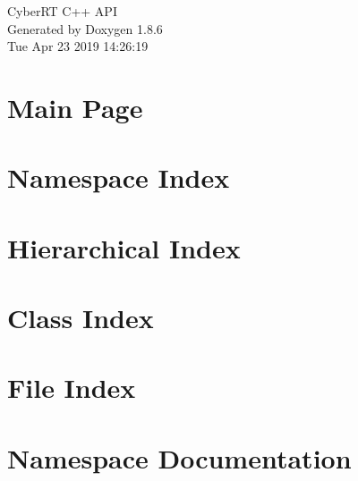\documentclass[twoside]{book}
\newcommand{\clearemptydoublepage}{%
  \newpage{\pagestyle{empty}\cleardoublepage}%
}
\begin{document}
\hypersetup{pageanchor=false}
\begin{titlepage}
\vspace*{7cm}
\begin{center}%
{\Large Cyber\-R\-T C++ A\-P\-I }\\
\vspace*{1cm}
{\large Generated by Doxygen 1.8.6}\\
\vspace*{0.5cm}
{\small Tue Apr 23 2019 14:26:19}\\
\end{center}
\end{titlepage}
\clearemptydoublepage
\tableofcontents
\clearemptydoublepage
{}
\hypersetup{pageanchor=true}

\chapter{Main Page}
\label{index}\hypertarget{index}{}
\chapter{Namespace Index}

\chapter{Hierarchical Index}

\chapter{Class Index}

\chapter{File Index}

\chapter{Namespace Documentation}






























\end{document}
